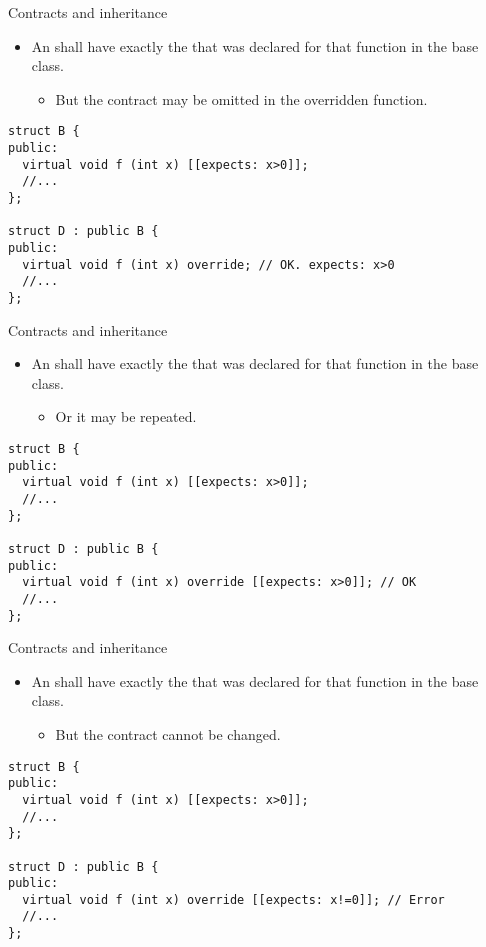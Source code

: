 \begin{frame}[t,fragile]{Contracts and inheritance}
\begin{itemize}
  \item An  shall have exactly the  that was declared for that function in the base class.
    \begin{itemize}
      \item But the contract may be omitted in the overridden function.
    \end{itemize}
\end{itemize}

\vfill\pause
\begin{lstlisting}
struct B {
public:
  virtual void f (int x) [[expects: x>0]];
  //...
};

struct D : public B {
public:
  virtual void f (int x) override; // OK. expects: x>0
  //...
};
\end{lstlisting}
\end{frame}

\begin{frame}[t,fragile]{Contracts and inheritance}
\begin{itemize}
  \item An  shall have exactly the  that was declared for that function in the base class.
    \begin{itemize}
      \item Or it may be repeated.
    \end{itemize}
\end{itemize}

\vfill\pause

\begin{lstlisting}
struct B {
public:
  virtual void f (int x) [[expects: x>0]];
  //...
};

struct D : public B {
public:
  virtual void f (int x) override [[expects: x>0]]; // OK
  //...
};
\end{lstlisting}
\end{frame}

\begin{frame}[t,fragile]{Contracts and inheritance}
\begin{itemize}
  \item An  shall have exactly the  that was declared for that function in the base class.
    \begin{itemize}
      \item But the contract cannot be changed.
    \end{itemize}
\end{itemize}

\vfill\pause

\begin{lstlisting}
struct B {
public:
  virtual void f (int x) [[expects: x>0]];
  //...
};

struct D : public B {
public:
  virtual void f (int x) override [[expects: x!=0]]; // Error
  //...
};
\end{lstlisting}
\end{frame}

